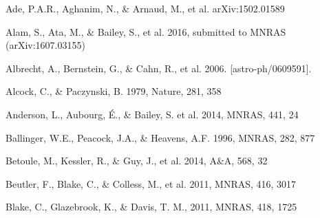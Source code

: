\documentclass[iop]{emulateapj}
\begin{document}
\begin{thebibliography}{}

Ade, P.A.R., Aghanim, N., \& Arnaud, M., et al. arXiv:1502.01589

Alam, S., Ata, M., \& Bailey, S., et al. 2016,
submitted to MNRAS (arXiv:1607.03155)

Albrecht, A., Bernstein, G., \& Cahn, R., et al. 2006. [astro-ph/0609591].



Alcock, C., \& Paczynski, B. 1979, Nature, 281, 358  


Anderson, L., Aubourg, \'E., \& Bailey, S. et al. 2014, MNRAS, 441, 24  


Ballinger, W.E., Peacock, J.A., \& Heavens, A.F. 1996, MNRAS, 282, 877  

Betoule, M., Kessler, R., \& Guy, J., et al. 2014, A\&A, 568, 32


Beutler, F., Blake, C., \& Colless, M., et al. 2011, MNRAS, 416, 3017



Blake, C., Glazebrook, K., \& Davis, T. M., 2011, MNRAS, 418, 1725  




\end{thebibliography}
\end{document}
